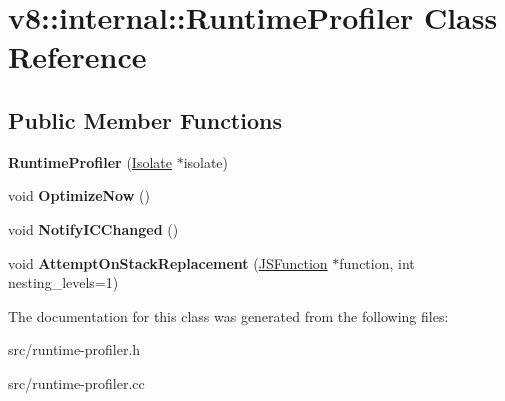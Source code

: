 \hypertarget{classv8_1_1internal_1_1_runtime_profiler}{}\section{v8\+:\+:internal\+:\+:Runtime\+Profiler Class Reference}
\label{classv8_1_1internal_1_1_runtime_profiler}
\subsection*{Public Member Functions}
\begin{DoxyCompactItemize}
\item 
\hypertarget{classv8_1_1internal_1_1_runtime_profiler_a1953dfce58c78e2f4c9e136b08cbfa8d}{}{\bfseries Runtime\+Profiler} (\hyperlink{classv8_1_1internal_1_1_isolate}{Isolate} $\ast$isolate)\label{classv8_1_1internal_1_1_runtime_profiler_a1953dfce58c78e2f4c9e136b08cbfa8d}

\item 
\hypertarget{classv8_1_1internal_1_1_runtime_profiler_a33305f844121f80c9133e98006b50988}{}void {\bfseries Optimize\+Now} ()\label{classv8_1_1internal_1_1_runtime_profiler_a33305f844121f80c9133e98006b50988}

\item 
\hypertarget{classv8_1_1internal_1_1_runtime_profiler_a9b44870acbaf140a44bb8261a055d592}{}void {\bfseries Notify\+I\+C\+Changed} ()\label{classv8_1_1internal_1_1_runtime_profiler_a9b44870acbaf140a44bb8261a055d592}

\item 
\hypertarget{classv8_1_1internal_1_1_runtime_profiler_af5e470de37a1598dc1fee837a5e9fdef}{}void {\bfseries Attempt\+On\+Stack\+Replacement} (\hyperlink{classv8_1_1internal_1_1_j_s_function}{J\+S\+Function} $\ast$function, int nesting\+\_\+levels=1)\label{classv8_1_1internal_1_1_runtime_profiler_af5e470de37a1598dc1fee837a5e9fdef}

\end{DoxyCompactItemize}


The documentation for this class was generated from the following files\+:\begin{DoxyCompactItemize}
\item 
src/runtime-\/profiler.\+h\item 
src/runtime-\/profiler.\+cc\end{DoxyCompactItemize}
